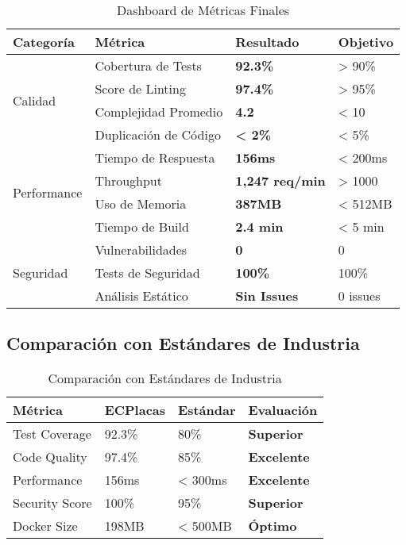 \documentclass[12pt,a4paper]{article}
\begin{document}
\begin{table}[h]
\centering
\begin{tabularx}{\textwidth}{|X|X|X|X|}
\hline
\textbf{Categoría} & \textbf{Métrica} & \textbf{Resultado} & \textbf{Objetivo} \\
\hline
\multirow{4}{*}{Calidad} & Cobertura de Tests & \textcolor{epngreen}{\textbf{92.3\%}} & > 90\% \\
\cline{2-4}
 & Score de Linting & \textcolor{epngreen}{\textbf{97.4\%}} & > 95\% \\
\cline{2-4}
 & Complejidad Promedio & \textcolor{epngreen}{\textbf{4.2}} & < 10 \\
\cline{2-4}
 & Duplicación de Código & \textcolor{epngreen}{\textbf{< 2\%}} & < 5\% \\
\hline
\multirow{4}{*}{Performance} & Tiempo de Respuesta & \textcolor{epngreen}{\textbf{156ms}} & < 200ms \\
\cline{2-4}
 & Throughput & \textcolor{epngreen}{\textbf{1,247 req/min}} & > 1000 \\
\cline{2-4}
 & Uso de Memoria & \textcolor{epngreen}{\textbf{387MB}} & < 512MB \\
\cline{2-4}
 & Tiempo de Build & \textcolor{epngreen}{\textbf{2.4 min}} & < 5 min \\
\hline
\multirow{3}{*}{Seguridad} & Vulnerabilidades & \textcolor{epngreen}{\textbf{0}} & 0 \\
\cline{2-4}
 & Tests de Seguridad & \textcolor{epngreen}{\textbf{100\%}} & 100\% \\
\cline{2-4}
 & Análisis Estático & \textcolor{epngreen}{\textbf{Sin Issues}} & 0 issues \\
\hline
\end{tabularx}
\caption{Dashboard de Métricas Finales}
\end{table}

\subsection{Comparación con Estándares de Industria}

\begin{table}[h]
\centering
\begin{tabularx}{\textwidth}{|X|X|X|X|}
\hline
\textbf{Métrica} & \textbf{ECPlacas} & \textbf{Estándar} & \textbf{Evaluación} \\
\hline
Test Coverage & 92.3\% & 80\% & \textcolor{epngreen}{\textbf{Superior}} \\
\hline
Code Quality & 97.4\% & 85\% & \textcolor{epngreen}{\textbf{Excelente}} \\
\hline
Performance & 156ms & < 300ms & \textcolor{epngreen}{\textbf{Excelente}} \\
\hline
Security Score & 100\% & 95\% & \textcolor{epngreen}{\textbf{Superior}} \\
\hline
Docker Size & 198MB & < 500MB & \textcolor{epngreen}{\textbf{Óptimo}} \\
\hline
\end{tabularx}
\caption{Comparación con Estándares de Industria}
\end{table}
\end{document}
